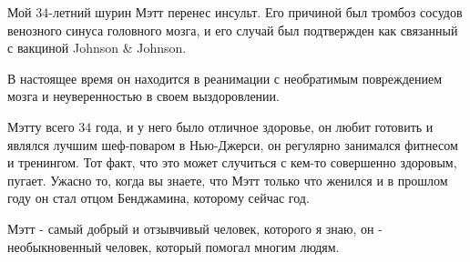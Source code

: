 Мой 34-летний шурин Мэтт перенес инсульт. Его причиной был тромбоз сосудов
венозного синуса головного мозга, и его случай был подтвержден как связанный с
вакциной Johnson \& Johnson.

В настоящее время он находится в реанимации с необратимым повреждением мозга и
неуверенностью в своем выздоровлении.

Мэтту всего 34 года, и у него было отличное здоровье, он любит готовить и
являлся лучшим шеф-поваром в Нью-Джерси, он регулярно занимался фитнесом и
тренингом. Тот факт, что это может случиться с кем-то совершенно здоровым,
пугает. Ужасно то, когда вы знаете, что Мэтт только что женился и в прошлом году
он стал отцом Бенджамина, которому сейчас год.

Мэтт - самый добрый и отзывчивый человек, которого я знаю, он - необыкновенный
человек, который помогал многим людям.

